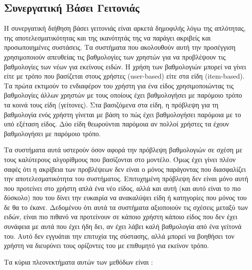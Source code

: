 \subsection{Συνεργατική Βάσει Γειτονιάς}
Η συνεργατική διήθηση βάσει γειτονιάς είναι αρκετά δημοφιλής λόγω της απλό\-τητας, της αποτελεσματικότητας και της ικανότητάς της να παράγει ακριβείς και προσωποιημένες συστάσεις.\cite{ricci2011recommender} Τα συστήματα που ακολουθούν αυτή την προσέγγιση χρησιμοποιούν απευθείας τις βαθμολογίες των χρηστών για να προβλέψουν τις βαθμολογίες των νέων για εκείνους ειδών. Η χρήση των βαθμολογιών μπορεί να γίνει είτε με τρόπο που βασίζεται στους χρήστες ({\en user-based}) είτε στα είδη ({\en item-based}). Τα πρώτα εκτιμούν το ενδιαφέρον του χρήστη για ένα είδος χρησιμοποιώντας τις βαθμολογίες άλλων χρηστών με τους οποίους έχει βαθμολογήσει με παρόμοιο τρόπο τα κοινά τους είδη (γείτονες). Στα βασιζόμενα στα είδη, η πρόβλεψη για τη βαθμολογία ενός χρήστη γίνεται με βάση το πώς έχει βαθμολογήσει παρόμοια με το υπό εξέταση είδος. Δύο είδη θεωρούνται παρόμοια αν πολλοί χρήστες τα έχουν βαθμολογήσει με παρόμοιο τρόπο. \par
Τα συστήματα αυτά υστερούν όσον αφορά την πρόβλεψη βαθμολογιών σε σχέση με τους καλύτερους αλγορίθμους που βασίζονται στο μοντέλο.\cite{Koren:2008:FMN:1401890.1401944, Takacs:2007:MCG:1345448.1345466} Όμως έχει γίνει πλέον σαφές ότι η ακρίβεια των προβλέψεων δεν είναι ο μόνος παράγοντας που διασφαλίζει την αποτελεσματικότητα του συστήματος. Επιτυχημένη πρόβλεψη δεν είναι μόνο αυτή που προτείνει στο χρήστη απλά ένα νέο είδος, αλλά και αυτή (και αυτό είναι το πιο δύσκολο) που του δίνει την ευκαιρία να ανακαλύψει είδη ή κατηγορίες που μόνος του δε θα το έκανε.\cite{Good:1999:CCF:315149.315352} Δεδομένου ότι αυτά τα συστήματα αξιοποιούν τις σχέσεις μεταξύ των ειδών, είναι πιο πιθανό να προτεί\-νουν σε κάποιο χρήστη κάποιο είδος που δεν έχει συνάφεια με αυτά που έχει ήδη δει, αν έχει λάβει καλή βαθμολογία από ένα γείτονά του. Αυτό δεν εγγυάται την επιτυχία της σύστασης, αλλά μπορεί να βοηθήσει τον χρήστη να διευρύνει τους ορίζοντες του με επιθυμητό για εκείνον τρόπο. \par
Τα κύρια πλεονεκτήματα αυτών των μεθόδων είναι \cite{ricci2011recommender}:
